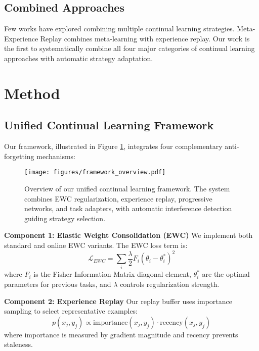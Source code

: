 \documentclass{article}
\begin{document}
\subsection{Combined Approaches}

Few works have explored combining multiple continual learning strategies. Meta-Experience Replay \cite{riemer2018learning} combines meta-learning with experience replay. Our work is the first to systematically combine all four major categories of continual learning approaches with automatic strategy adaptation.

\section{Method}

\subsection{Unified Continual Learning Framework}

Our framework, illustrated in Figure \ref{fig:framework}, integrates four complementary anti-forgetting mechanisms:

\begin{figure}[ht]
\centering
\texttt{[image: figures/framework\_overview.pdf]}
\caption{Overview of our unified continual learning framework. The system combines EWC regularization, experience replay, progressive networks, and task adapters, with automatic interference detection guiding strategy selection.}
\label{fig:framework}
\end{figure}

\textbf{Component 1: Elastic Weight Consolidation (EWC)}
We implement both standard and online EWC variants. The EWC loss term is:
\begin{equation}
    \mathcal{L}_{EWC} = \sum_{i} \frac{\lambda}{2} F_i (\theta_i - \theta_i^*)^2
\end{equation}
where $F_i$ is the Fisher Information Matrix diagonal element, $\theta_i^*$ are the optimal parameters for previous tasks, and $\lambda$ controls regularization strength.

\textbf{Component 2: Experience Replay}
Our replay buffer uses importance sampling to select representative examples:
\begin{equation}
    p(x_j, y_j) \propto \text{importance}(x_j, y_j) \cdot \text{recency}(x_j, y_j)
\end{equation}
where importance is measured by gradient magnitude and recency prevents staleness.
\end{document}
